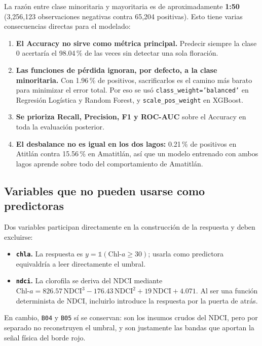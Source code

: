 \documentclass[11pt]{article}
\begin{document}
La razón entre clase minoritaria y mayoritaria es de aproximadamente \textbf{1:50} (3{,}256{,}123 observaciones negativas contra 65{,}204 positivas). Esto tiene varias consecuencias directas para el modelado:

\begin{enumerate}
    \item \textbf{El Accuracy no sirve como métrica principal.} Predecir siempre la clase 0 acertaría el 98.04\,\% de las veces sin detectar una sola floración.
    \item \textbf{Las funciones de pérdida ignoran, por defecto, a la clase minoritaria.} Con 1.96\,\% de positivos, sacrificarlos es el camino más barato para minimizar el error total. Por eso se usó \texttt{class\_weight='balanced'} en Regresión Logística y Random Forest, y \texttt{scale\_pos\_weight} en XGBoost.
    \item \textbf{Se prioriza Recall, Precision, F1 y ROC-AUC} sobre el Accuracy en toda la evaluación posterior.
    \item \textbf{El desbalance no es igual en los dos lagos:} 0.21\,\% de positivos en Atitlán contra 15.56\,\% en Amatitlán, así que un modelo entrenado con ambos lagos aprende sobre todo del comportamiento de Amatitlán.
\end{enumerate}

\subsection{Variables que no pueden usarse como predictoras}

Dos variables participan directamente en la construcción de la respuesta y deben excluirse:

\begin{itemize}
    \item \textbf{\texttt{chla}.} La respuesta es \(y = \mathbb{1}(\text{Chl-}a \ge 30)\); usarla como predictora equivaldría a leer directamente el umbral.
    \item \textbf{\texttt{ndci}.} La clorofila se deriva del NDCI mediante \(\text{Chl-}a = 826.57\,\text{NDCI}^3 - 176.43\,\text{NDCI}^2 + 19\,\text{NDCI} + 4.071\). Al ser una función determinista de NDCI, incluirlo introduce la respuesta por la puerta de atrás.
\end{itemize}

En cambio, \texttt{B04} y \texttt{B05} sí se conservan: son los insumos crudos del NDCI, pero por separado no reconstruyen el umbral, y son justamente las bandas que aportan la señal física del borde rojo.
\end{document}
